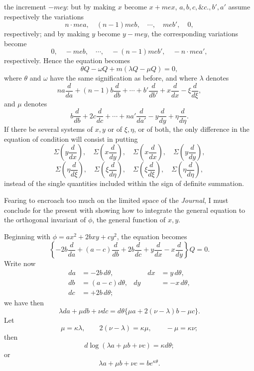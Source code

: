 \documentclass[11pt]{article}
\newcommand{\sourcepage}[1]{\marginpar{\scriptsize p.~#1}}
\begin{document}
{{\sourcepage{358}
the increment $-mey$: but by making $x$ become $x+mex$, $a,b,c,\&c.,b',a'$ assume respectively the variations
\[
n\cdot mea,
\quad (n-1)meb,
\quad \cdots,
\quad meb',
\quad 0,
\]
respectively; and by making $y$ become $y-mey$, the corresponding variations become
\[
0,
\quad -meb,
\quad \cdots,
\quad -(n-1)meb',
\quad -n\cdot mea',
\]
respectively. Hence the equation becomes
\[
\theta Q-\omega Q+m(\lambda Q-\mu Q)=0,
\]
where $\theta$ and $\omega$ have the same signification as before, and where $\lambda$ denotes
\[
na\frac{d}{da}+(n-1)b\frac{d}{db}+\cdots+b'\frac{d}{db'}+x\frac{d}{dx}-\xi\frac{d}{d\xi},
\]
and $\mu$ denotes
\[
b\frac{d}{db}+2c\frac{d}{dc}+\cdots+na'\frac{d}{da'}-y\frac{d}{dy}+\eta\frac{d}{d\eta}.
\]
If there be several systems of $x,y$ or of $\xi,\eta$, or of both, the only difference in the equation of condition will consist in putting
\[
\Sigma\left(y\frac{d}{dx}\right),\quad
\Sigma\left(x\frac{d}{dy}\right),\quad
\Sigma\left(x\frac{d}{dx}\right),\quad
\Sigma\left(y\frac{d}{dy}\right),
\]
\[
\Sigma\left(\eta\frac{d}{d\xi}\right),\quad
\Sigma\left(\xi\frac{d}{d\eta}\right),\quad
\Sigma\left(\xi\frac{d}{d\xi}\right),\quad
\Sigma\left(\eta\frac{d}{d\eta}\right),
\]
instead of the single quantities included within the sign of definite summation.

Fearing to encroach too much on the limited space of the \emph{Journal}, I must conclude for the present with showing how to integrate the general equation to the orthogonal invariant of $\phi$, the general function of $x,y$.

Beginning with $\phi=ax^2+2bxy+cy^2$, the equation becomes
\[
\left\{-2b\frac{d}{da}+(a-c)\frac{d}{db}+2b\frac{d}{dc}+y\frac{d}{dx}-x\frac{d}{dy}\right\}Q=0.
\]
Write now
\[
\begin{aligned}
da&=-2b\,d\theta,&\qquad dx&=y\,d\theta,\\
db&=(a-c)d\theta,& dy&=-x\,d\theta,\\
dc&=+2b\,d\theta;
\end{aligned}
\]
we have then
\[
\lambda da+\mu db+\nu dc=d\theta\{\mu a+2(\nu-\lambda)b-\mu c\}.
\]
Let
\[
\mu=\kappa\lambda,
\qquad 2(\nu-\lambda)=\kappa\mu,
\qquad -\mu=\kappa\nu;
\]
then
\[
d\log(\lambda a+\mu b+\nu c)=\kappa d\theta;
\]
or
\[
\lambda a+\mu b+\nu c=be^{\kappa\theta}.
\]

}}
\end{document}
